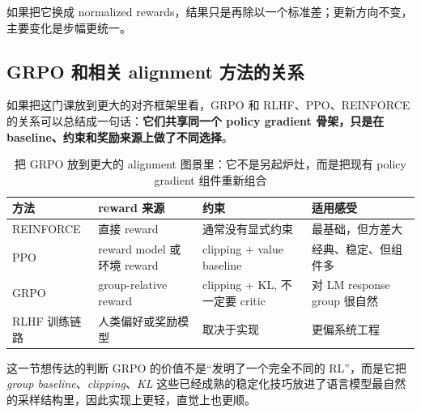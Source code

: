 如果把它换成 normalized rewards，结果只是再除以一个标准差；更新方向不变，主要变化是步幅更统一。


\subsection{GRPO 和相关 alignment 方法的关系}

如果把这门课放到更大的对齐框架里看，GRPO 和 RLHF、PPO、REINFORCE 的关系可以总结成一句话：\textbf{它们共享同一个 policy gradient 骨架，只是在 baseline、约束和奖励来源上做了不同选择}。

\begin{table}[H]
\centering
\begin{tabular}{@{}p{2.7cm}p{3.7cm}p{3.7cm}p{3.5cm}@{}}
\toprule
\textbf{方法} & \textbf{reward 来源} & \textbf{约束} & \textbf{适用感受} \\
\midrule
REINFORCE & 直接 reward & 通常没有显式约束 & 最基础，但方差大 \\
PPO & reward model 或环境 reward & clipping + value baseline & 经典、稳定、但组件多 \\
GRPO & group-relative reward & clipping + KL, 不一定要 critic & 对 LM response group 很自然 \\
RLHF 训练链路 & 人类偏好或奖励模型 & 取决于实现 & 更偏系统工程 \\
\bottomrule
\end{tabular}
\caption{把 GRPO 放到更大的 alignment 图景里：它不是另起炉灶，而是把现有 policy gradient 组件重新组合}
\end{table}

\begin{importantbox}{这一节想传达的判断}
GRPO 的价值不是“发明了一个完全不同的 RL”，而是它把 \emph{group baseline}、\emph{clipping}、\emph{KL} 这些已经成熟的稳定化技巧放进了语言模型最自然的采样结构里，因此实现上更轻，直觉上也更顺。
\end{importantbox}

